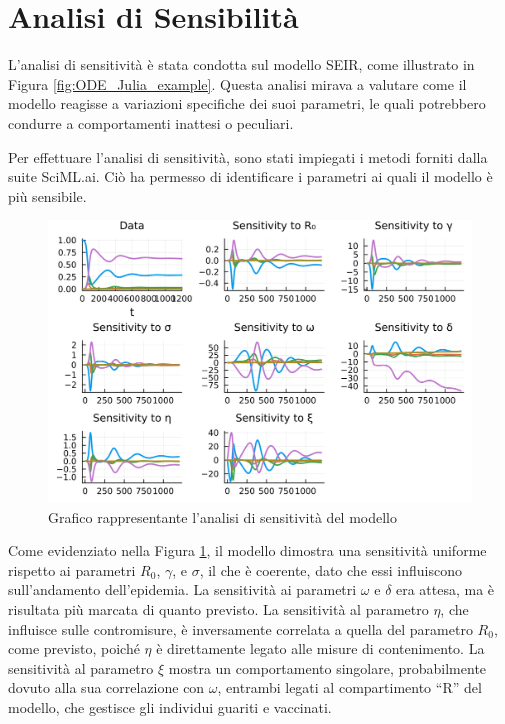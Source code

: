 \section{Analisi di Sensibilità}

L'analisi di sensitività è stata condotta sul modello SEIR, 
come illustrato in Figura \ref{fig:ODE_Julia_example}. 
Questa analisi mirava a valutare come il modello reagisse a 
variazioni specifiche dei suoi parametri, le quali potrebbero 
condurre a comportamenti inattesi o peculiari.

Per effettuare l'analisi di sensitività, sono stati impiegati i 
metodi forniti dalla suite SciML.ai. Ciò ha permesso di identificare 
i parametri ai quali il modello è più sensibile.

\begin{figure}[H]
    \begin{center}
		\includegraphics[width=\textwidth]{img/sa.jpg}
		\caption{Grafico rappresentante l'analisi di sensitività del modello}
		\label{fig:sens_anal}
	\end{center}
\end{figure}

Come evidenziato nella Figura \ref{fig:sens_anal}, il modello 
dimostra una sensitività uniforme rispetto ai parametri 
$R_0$, $\gamma$, e $\sigma$, il che è coerente, dato che essi 
influiscono sull'andamento dell'epidemia. La sensitività ai parametri 
$\omega$ e $\delta$ era attesa, ma è risultata più marcata di 
quanto previsto. La sensitività al parametro $\eta$, che influisce 
sulle contromisure, è inversamente correlata a quella del 
parametro $R_0$, come previsto, poiché $\eta$ è direttamente 
legato alle misure di contenimento. La sensitività al parametro 
$\xi$ mostra un comportamento singolare, probabilmente dovuto 
alla sua correlazione con $\omega$, entrambi legati al compartimento 
``R'' del modello, che gestisce gli individui guariti e vaccinati.


